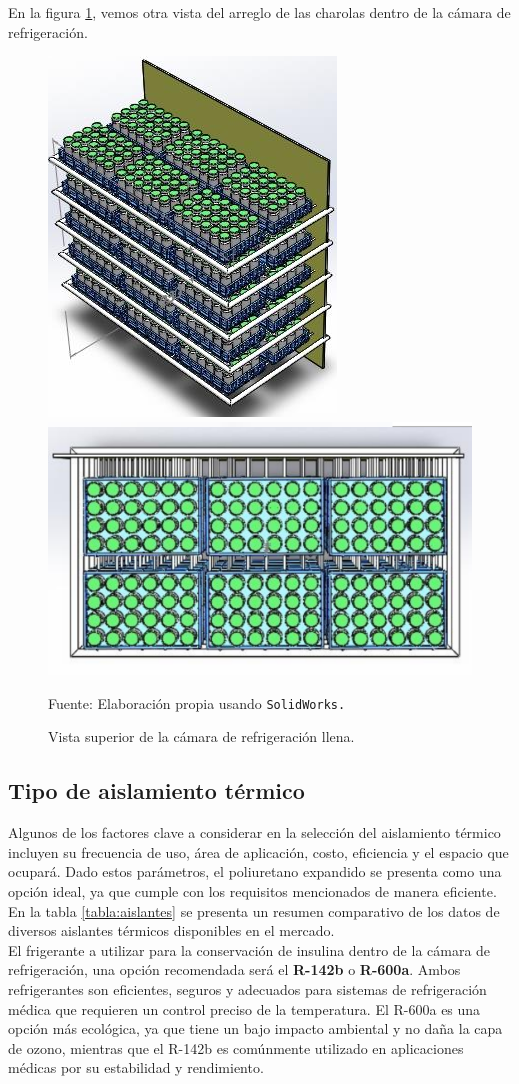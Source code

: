 En la figura  \ref{fig:4-superiorlcharolas}, vemos otra vista del arreglo de las charolas dentro de la cámara de refrigeración.

\begin{figure}[H]
	\centering
	\includegraphics[width=0.5\linewidth]{figures/4-superiorlcharolas}\includegraphics[width=0.6\linewidth]{figures/4-superiorlcharolas2}
	\caption{Vista superior de la cámara de refrigeración llena.}
		Fuente: Elaboración propia usando \texttt{SolidWorks.}
	\label{fig:4-superiorlcharolas}
\end{figure}

 



\subsection{Tipo de aislamiento térmico}

Algunos de los factores clave a considerar en la selección del aislamiento térmico incluyen su frecuencia de uso, área de aplicación, costo, eficiencia y el espacio que ocupará. Dado estos parámetros, el poliuretano expandido se presenta como una opción ideal, ya que cumple con los requisitos mencionados de manera eficiente. En la tabla \ref{tabla:aislantes} se presenta un resumen comparativo de los datos de diversos aislantes térmicos disponibles en el mercado.\\
El frigerante a utilizar para la conservación de insulina dentro de la cámara de refrigeración, una opción recomendada será el  \textbf{R-142b} o \textbf{R-600a}. Ambos refrigerantes son eficientes, seguros y adecuados para sistemas de refrigeración médica que requieren un control preciso de la temperatura. El R-600a es una opción más ecológica, ya que tiene un bajo impacto ambiental y no daña la capa de ozono, mientras que el R-142b es comúnmente utilizado en aplicaciones médicas por su estabilidad y rendimiento.

